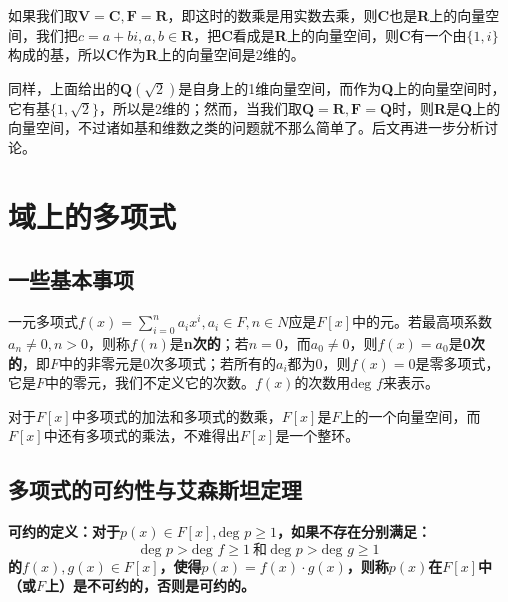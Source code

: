 \documentclass[12pt]{article}
\begin{document}
如果我们取$\textbf{V} = \textbf{C}, \textbf{F} = \textbf{R}$，即这时的数乘是用实数去乘，则\textbf{C}也是\textbf{R}上的向量空间，我们把$c = a + bi, a, b \in \textbf{R}$，把\textbf{C}看成是\textbf{R}上的向量空间，则\textbf{C}有一个由$\{1, i\}$构成的基，所以\textbf{C}作为\textbf{R}上的向量空间是2维的。

同样，上面给出的$\textbf{Q}(\sqrt{2})$是自身上的1维向量空间，而作为\textbf{Q}上的向量空间时，它有基$\{1, \sqrt{2}\}$，所以是2维的；然而，当我们取$\textbf{Q} = \textbf{R}, \textbf{F} = \textbf{Q}$时，则\textbf{R}是\textbf{Q}上的向量空间，不过诸如基和维数之类的问题就不那么简单了。后文再进一步分析讨论。

\section{域上的多项式}
\subsection{一些基本事项}
一元多项式$f(x) = \sum_{i=0}^na_ix^i, a_i \in F, n \in N$应是$F[x]$中的元。若最高项系数$a_n \neq 0, n > 0$，则称$f(n)$是\textbf{n次的}；若$n=0$，而$a_0 \neq 0$，则$f(x) = a_0 $是\textbf{0次的}，即$F$中的非零元是0次多项式；若所有的$a_i$都为0，则$f(x) = 0$是零多项式，它是$F$中的零元，我们不定义它的次数。$f(x)$的次数用$\text{deg\ } f$来表示。

对于$F[x]$中多项式的加法和多项式的数乘，$F[x]$是$F$上的一个向量空间，而$F[x]$中还有多项式的乘法，不难得出$F[x]$是一个整环。

\subsection{多项式的可约性与艾森斯坦定理}
\begin{mdframed}[
linecolor=black!40,outerlinewidth=1pt,roundcorner=.5em,innertopmargin=1ex,innerbottommargin=.5\baselineskip,innerrightmargin=1em,innerleftmargin=1em,backgroundcolor=gray!5,
]
\textbf{
可约的定义：对于$p(x) \in F[x], \text{deg\ } p \ge 1$，如果不存在分别满足：
$$
\text{deg\ }p  > \text{deg\ }f \ge 1 \ \text{和} \ \text{deg\ }p > \text{deg\ }g \ge 1
$$
的$f(x), g(x) \in F[x]$，使得$p(x) = f(x) \cdot g(x)$，则称$p(x)$在$F[x]$中（或$F$上）是不可约的，否则是可约的。
}
\end{mdframed}
\end{document}

